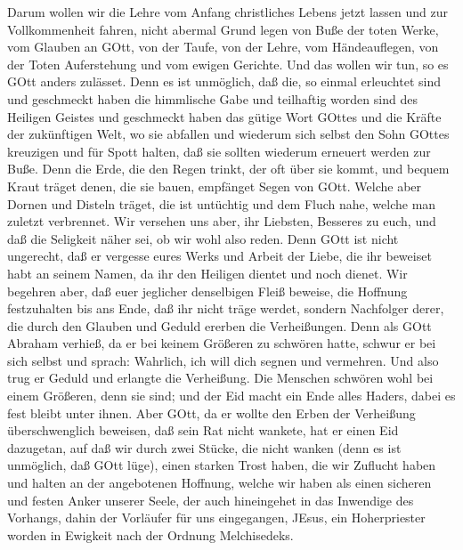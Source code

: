  Darum wollen wir die Lehre vom Anfang christliches Lebens
jetzt lassen und zur Vollkommenheit fahren, nicht abermal Grund legen
von Buße der toten Werke, vom Glauben an GOtt,  von der
Taufe, von der Lehre, vom Händeauflegen, von der Toten Auferstehung und
vom ewigen Gerichte.  Und das wollen wir tun, so es GOtt
anders zulässet.  Denn es ist unmöglich, daß die, so einmal
erleuchtet sind und geschmeckt haben die himmlische Gabe und teilhaftig
worden sind des Heiligen Geistes  und geschmeckt haben das
gütige Wort GOttes und die Kräfte der zukünftigen Welt,  wo
sie abfallen und wiederum sich selbst den Sohn GOttes kreuzigen und für
Spott halten, daß sie sollten wiederum erneuert werden zur Buße.
 Denn die Erde, die den Regen trinkt, der oft über sie
kommt, und bequem Kraut träget denen, die sie bauen, empfänget Segen von
GOtt.  Welche aber Dornen und Disteln träget, die ist
untüchtig und dem Fluch nahe, welche man zuletzt verbrennet.
 Wir versehen uns aber, ihr Liebsten, Besseres zu euch, und
daß die Seligkeit näher sei, ob wir wohl also reden.  Denn
GOtt ist nicht ungerecht, daß er vergesse eures Werks und Arbeit der
Liebe, die ihr beweiset habt an seinem Namen, da ihr den Heiligen
dientet und noch dienet.  Wir begehren aber, daß euer
jeglicher denselbigen Fleiß beweise, die Hoffnung festzuhalten bis ans
Ende,  daß ihr nicht träge werdet, sondern Nachfolger
derer, die durch den Glauben und Geduld ererben die Verheißungen.
 Denn als GOtt Abraham verhieß, da er bei keinem Größeren
zu schwören hatte, schwur er bei sich selbst  und sprach:
Wahrlich, ich will dich segnen und vermehren.  Und also
trug er Geduld und erlangte die Verheißung.  Die Menschen
schwören wohl bei einem Größeren, denn sie sind; und der Eid macht ein
Ende alles Haders, dabei es fest bleibt unter ihnen.  Aber
GOtt, da er wollte den Erben der Verheißung überschwenglich beweisen,
daß sein Rat nicht wankete, hat er einen Eid dazugetan, 
auf daß wir durch zwei Stücke, die nicht wanken (denn es ist unmöglich,
daß GOtt lüge), einen starken Trost haben, die wir Zuflucht haben und
halten an der angebotenen Hoffnung,  welche wir haben als
einen sicheren und festen Anker unserer Seele, der auch hineingehet in
das Inwendige des Vorhangs,  dahin der Vorläufer für uns
eingegangen, JEsus, ein Hoherpriester worden in Ewigkeit nach der
Ordnung Melchisedeks.

